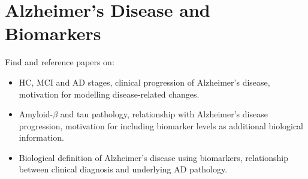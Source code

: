 \section{Alzheimer's Disease and Biomarkers}
Find and reference papers on:
\begin{itemize}
    \item HC, MCI and AD stages, clinical progression of Alzheimer's disease, motivation for modelling disease-related changes.
    \item Amyloid-$\beta$ and tau pathology, relationship with Alzheimer's disease progression, motivation for including biomarker levels as additional biological information.
    \item Biological definition of Alzheimer's disease using biomarkers, relationship between clinical diagnosis and underlying AD pathology.
\end{itemize}
